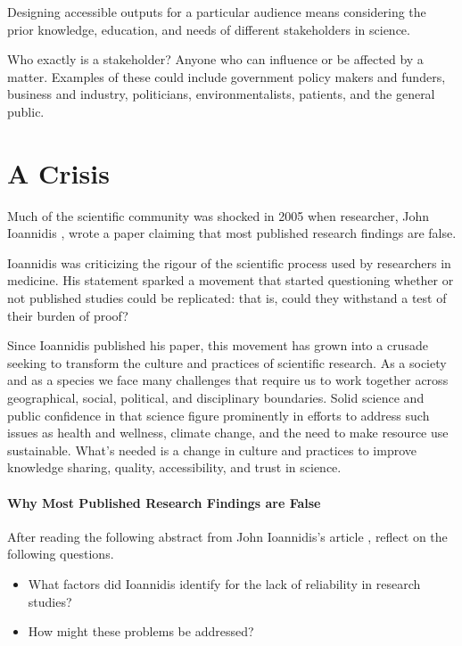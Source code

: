\documentclass[
]{book}
\providecommand{\tightlist}{%
  \setlength{\itemsep}{0pt}\setlength{\parskip}{0pt}}
\begin{document}
Designing accessible outputs for a particular audience means considering the prior knowledge, education, and needs of different stakeholders in science.

Who exactly is a stakeholder? Anyone who can influence or be affected by a matter. Examples of these could include government policy makers and funders, business and industry, politicians, environmentalists, patients, and the general public.

\hypertarget{a-crisis}{%
\section{A Crisis}\label{a-crisis}}

Much of the scientific community was shocked in 2005 when researcher, John Ioannidis \citep{ioannidis_why_2005}, wrote a paper claiming that most published research findings are false.

Ioannidis was criticizing the rigour of the scientific process used by researchers in medicine. His statement sparked a movement that started questioning whether or not published studies could be replicated: that is, could they withstand a test of their burden of proof?

Since Ioannidis published his paper, this movement has grown into a crusade seeking to transform the culture and practices of scientific research. As a society and as a species we face many challenges that require us to work together across geographical, social, political, and disciplinary boundaries. Solid science and public confidence in that science figure prominently in efforts to address such issues as health and wellness, climate change, and the need to make resource use sustainable. What's needed is a change in culture and practices to improve knowledge sharing, quality, accessibility, and trust in science.

\hypertarget{why-most-published-research-findings-are-false}{%
\paragraph*{Why Most Published Research Findings are False}\label{why-most-published-research-findings-are-false}}

After reading the following abstract from John Ioannidis's article \citep{ioannidis_why_2005}, reflect on the following questions.

\begin{itemize}
\tightlist
\item
  What factors did Ioannidis identify for the lack of reliability in research studies?
\item
  How might these problems be addressed?
\end{itemize}
\end{document}
